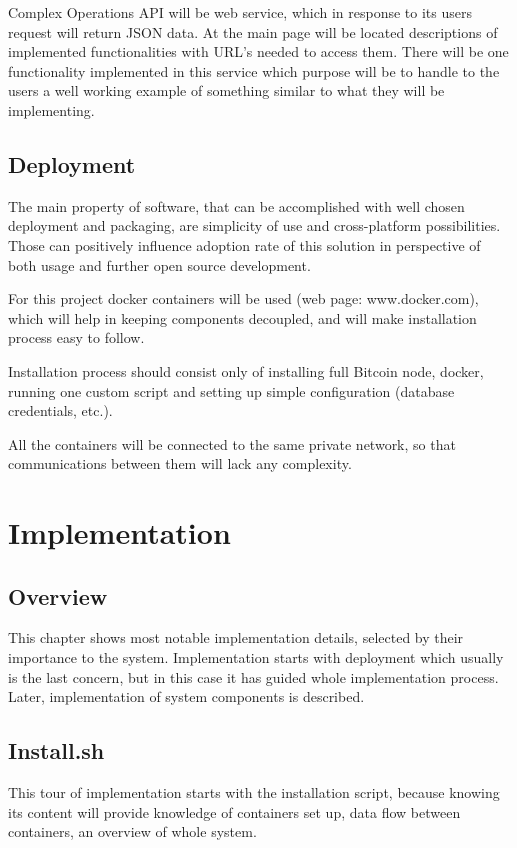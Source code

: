 \documentclass[12pt, en, eng, oneside]{mgr}
\begin{document}
Complex Operations API will be web service, which in response to its users request will return JSON data. At the main page will be located descriptions of implemented functionalities with URL's needed to access them. There will be one functionality implemented in this service which purpose will be to handle to the users a well working example of something similar to what they will be implementing.   

\section{Deployment}

The main property of software, that can be accomplished with well chosen deployment and packaging, are simplicity of use and cross-platform possibilities. Those can positively influence adoption rate of this solution in perspective of both usage and further open source development.

For this project docker containers will be used (web page: www.docker.com), which will help in keeping components decoupled, and will make installation process easy to follow. 

Installation process should consist only of installing full Bitcoin node, docker, running one custom script and setting up simple configuration (database credentials, etc.).

All the containers will be connected to the same private network, so that communications between them will lack any complexity.

\chapter{Implementation}

\section{Overview}
This chapter shows most notable implementation details, selected by their importance to the system. Implementation starts with deployment which usually is the last concern, but in this case it has guided whole implementation process. Later, implementation of system components is described.

\section{Install.sh}
This tour of implementation starts with the installation script, because knowing its content will provide knowledge of containers set up, data flow between containers, an overview of whole system.
\end{document}
